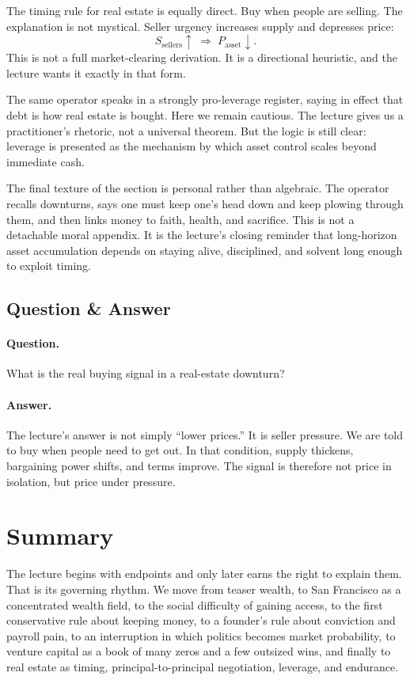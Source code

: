 The timing rule for real estate is equally direct. Buy when people are selling. The explanation is not mystical. Seller urgency increases supply and depresses price:
\begin{equation}
S_{\text{sellers}}\uparrow \;\Rightarrow\; P_{\text{asset}}\downarrow.
\end{equation}
This is not a full market-clearing derivation. It is a directional heuristic, and the lecture wants it exactly in that form.

The same operator speaks in a strongly pro-leverage register, saying in effect that debt is how real estate is bought. Here we remain cautious. The lecture gives us a practitioner's rhetoric, not a universal theorem. But the logic is still clear: leverage is presented as the mechanism by which asset control scales beyond immediate cash.

The final texture of the section is personal rather than algebraic. The operator recalls downturns, says one must keep one's head down and keep plowing through them, and then links money to faith, health, and sacrifice. This is not a detachable moral appendix. It is the lecture's closing reminder that long-horizon asset accumulation depends on staying alive, disciplined, and solvent long enough to exploit timing.

\subsection{Question \& Answer}

\paragraph{Question.} What is the real buying signal in a real-estate downturn?

\paragraph{Answer.} The lecture's answer is not simply ``lower prices.'' It is seller pressure. We are told to buy when people need to get out. In that condition, supply thickens, bargaining power shifts, and terms improve. The signal is therefore not price in isolation, but price under pressure.

\section{Summary}

The lecture begins with endpoints and only later earns the right to explain them. That is its governing rhythm. We move from teaser wealth, to San Francisco as a concentrated wealth field, to the social difficulty of gaining access, to the first conservative rule about keeping money, to a founder's rule about conviction and payroll pain, to an interruption in which politics becomes market probability, to venture capital as a book of many zeros and a few outsized wins, and finally to real estate as timing, principal-to-principal negotiation, leverage, and endurance.

